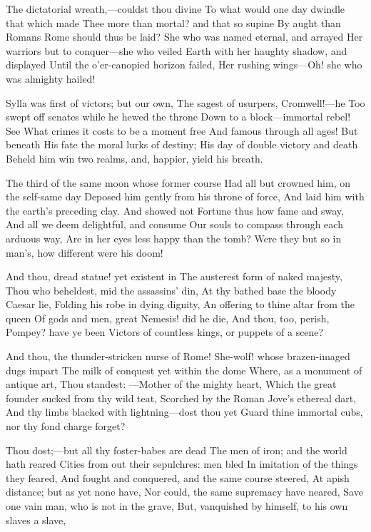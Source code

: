 \documentclass[10pt,twocolumn]{book}
\begin{document}
   The dictatorial wreath,---couldst thou divine
   To what would one day dwindle that which made
   Thee more than mortal? and that so supine
   By aught than Romans Rome should thus be laid?
   She who was named eternal, and arrayed
   Her warriors but to conquer---she who veiled
   Earth with her haughty shadow, and displayed
   Until the o'er-canopied horizon failed,
Her rushing wings---Oh! she who was almighty hailed!


   Sylla was first of victors; but our own,
   The sagest of usurpers, Cromwell!---he
   Too swept off senates while he hewed the throne
   Down to a block---immortal rebel!  See
   What crimes it costs to be a moment free
   And famous through all ages!  But beneath
   His fate the moral lurks of destiny;
   His day of double victory and death
Beheld him win two realms, and, happier, yield his breath.


   The third of the same moon whose former course
   Had all but crowned him, on the self-same day
   Deposed him gently from his throne of force,
   And laid him with the earth's preceding clay.
   And showed not Fortune thus how fame and sway,
   And all we deem delightful, and consume
   Our souls to compass through each arduous way,
   Are in her eyes less happy than the tomb?
Were they but so in man's, how different were his doom!


   And thou, dread statue! yet existent in
   The austerest form of naked majesty,
   Thou who beheldest, mid the assassins' din,
   At thy bathed base the bloody Caesar lie,
   Folding his robe in dying dignity,
   An offering to thine altar from the queen
   Of gods and men, great Nemesis! did he die,
   And thou, too, perish, Pompey? have ye been
Victors of countless kings, or puppets of a scene?


   And thou, the thunder-stricken nurse of Rome!
   She-wolf! whose brazen-imaged dugs impart
   The milk of conquest yet within the dome
   Where, as a monument of antique art,
   Thou standest: ---Mother of the mighty heart,
   Which the great founder sucked from thy wild teat,
   Scorched by the Roman Jove's ethereal dart,
   And thy limbs blacked with lightning---dost thou yet
Guard thine immortal cubs, nor thy fond charge forget?


   Thou dost;---but all thy foster-babes are dead\textemdash
   The men of iron; and the world hath reared
   Cities from out their sepulchres:  men bled
   In imitation of the things they feared,
   And fought and conquered, and the same course steered,
   At apish distance; but as yet none have,
   Nor could, the same supremacy have neared,
   Save one vain man, who is not in the grave,
But, vanquished by himself, to his own slaves a slave,
\end{document}
